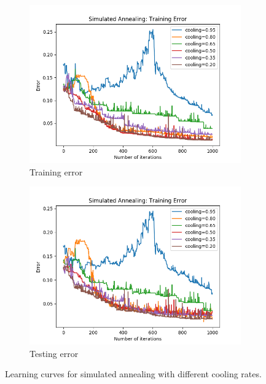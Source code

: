 \documentclass{article}
\begin{document}
        \begin{figure}[htb]
        \centering

        \begin{subfigure}{0.5\textwidth}
          \includegraphics[width=\linewidth]{out/sa/cooling-error-training.png}
          \caption{Training error}
          \label{fig:sa-params-1}
        \end{subfigure}\hfil
        \begin{subfigure}{0.5\textwidth}
          \includegraphics[width=\linewidth]{out/sa/cooling-error-testing.png}
          \caption{Testing error}
          \label{fig:sa-params-2}
        \end{subfigure}

        \caption{Learning curves for simulated annealing with different cooling rates.}
        \label{fig:sa-params}
        \end{figure}
\end{document}
